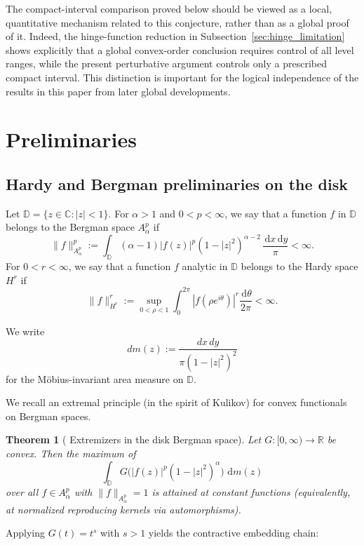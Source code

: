 \documentclass[11pt]{amsart}
\theoremstyle{plain}
\newtheorem{theorem}{Theorem}[section]
\theoremstyle{definition}
\theoremstyle{remark}
\newcommand{\D}{\mathbb{D}}
\newcommand{\R}{\mathbb{R}}
\newcommand{\C}{\mathbb{C}}
\newcommand{\dd}{\,\mathrm{d}}
\newcommand{\Ap}[2]{A^{#1}_{#2}}
\newcommand{\Hp}[1]{H^{#1}}
\newcommand{\dm}{\,\mathrm{d}m}
\begin{document}
The compact-interval comparison proved below should be viewed as a local,
quantitative mechanism related to this conjecture, rather than as a global
proof of it. Indeed, the hinge-function reduction in
Subsection~\ref{sec:hinge_limitation} shows explicitly that a global
convex-order conclusion requires control of all level ranges, while the
present perturbative argument controls only a prescribed compact interval.
This distinction is important for the logical independence of the results in
this paper from later global developments.

\section{Preliminaries}
\subsection{Hardy and Bergman preliminaries on the disk}

Let $\D=\{z\in\C:|z|<1\}$. For $\alpha>1$ and $0<p<\infty$, we say that a function $f$ in $\D$ belongs to the Bergman space $\Ap{p}{\alpha}$ if
\[
\|f\|_{\Ap{p}{\alpha}}^p := \int_{\D} (\alpha-1) |f(z)|^p (1-|z|^2)^{\alpha-2}\,\frac{\dd x\dd y}{\pi}<\infty.
\]
For $0<r<\infty$, we say that a function $f$ analytic in $\D$ belongs to the Hardy space $\Hp{r}$ if
\[
\|f\|_{\Hp{r}}^r := \sup_{0<\rho<1}\int_0^{2\pi} |f(\rho e^{i\theta})|^r\frac{\dd\theta}{2\pi}<\infty.
\]

We write
\[
dm(z):=\frac{dx\,dy}{\pi(1-|z|^2)^2}
\]
for the M\"obius-invariant area measure on $\D$.

We recall an extremal principle (in the spirit of Kulikov) for convex functionals on Bergman spaces.

\begin{theorem}[\cite{KulikovGAFA2022} Extremizers in the disk Bergman space]\label{thm:BergmanDisk}
Let $G:[0,\infty)\to\R$ be convex. Then the maximum of
\begin{equation*}\label{eq:bergmanineq}
\int_{\D} G\bigl(|f(z)|^p(1-|z|^2)^\alpha\bigr)\,\dm(z)
\end{equation*}
over all $f\in \Ap{p}{\alpha}$ with $\|f\|_{\Ap{p}{\alpha}}=1$
is attained at constant functions (equivalently, at normalized reproducing kernels via automorphisms).
\end{theorem}

Applying $G(t)=t^s$ with $s>1$ yields the contractive embedding chain:
\end{document}
